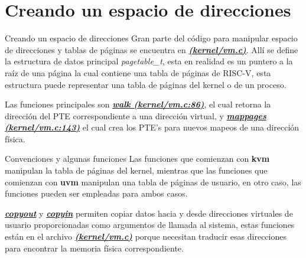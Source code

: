 \documentclass{libs/ufc_format}
\begin{document}
\section{Creando un espacio de direcciones}
\begin{frame}{Creando un espacio de direcciones}
  Gran parte del código para manipular espacio de direcciones y tablas de páginas se encuentra en \href{https://github.com/CarlosSandoval-03/xv6-riscv/blob/riscv/kernel/vm.c}{\textbf{\textit{(kernel/vm.c)}}}. Allí se define la estructura de datos principal \emph{pagetable\_t}, esta en realidad es un puntero a la raíz de una página la cual contiene una tabla de páginas de RISC-V, esta estructura puede representar una tabla de páginas del kernel o de un proceso.

  \vspace{0.4cm}

  Las funciones principales son \href{https://github.com/CarlosSandoval-03/xv6-riscv/blob/riscv/kernel/vm.c\#L86}{\textbf{\textit{walk (kernel/vm.c:86)}}}, el cual retorna la dirección del PTE correspondiente a una dirección virtual, y \href{https://github.com/CarlosSandoval-03/xv6-riscv/blob/riscv/kernel/vm.c\#L143}{\textbf{\textit{mappages (kernel/vm.c:143)}}} el cual crea los PTE's para nuevos mapeos de una dirección física. \cite{xv6_book} \cite{xv6}
\end{frame}
\begin{frame}{Convenciones y algunas funciones}
  Las funciones que comienzan con \textbf{kvm} manipulan la tabla de páginas del kernel, mientras que las funciones que comienzan con \textbf{uvm} manipulan una tabla de páginas de usuario, en otro caso, las funciones pueden ser empleadas para ambos casos.

  \vspace{0.4cm}

  \href{https://github.com/CarlosSandoval-03/xv6-riscv/blob/riscv/kernel/vm.c\#L352}{\textbf{\textit{copyout}}} y \href{https://github.com/CarlosSandoval-03/xv6-riscv/blob/riscv/kernel/vm.c\#L377}{\textbf{\textit{copyin}}} permiten copiar datos hacia y desde direcciones virtuales de usuario proporcionadas como argumentos de llamada al sistema, estas funciones están en el archivo \href{https://github.com/CarlosSandoval-03/xv6-riscv/blob/riscv/kernel/vm.c}{\textbf{\textit{(kernel/vm.c)}}} porque necesitan traducir esas direcciones para encontrar la memoria física correspondiente. \cite{xv6_book} \cite{xv6}
\end{frame}
\end{document}
